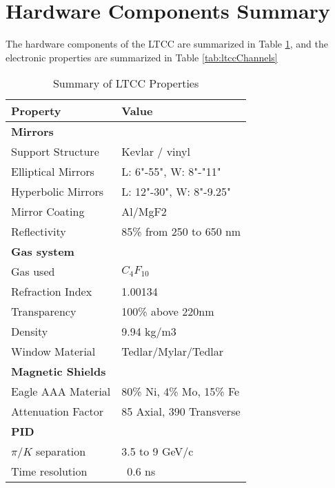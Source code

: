 \section{Hardware Components Summary}


The hardware components of the LTCC are summarized in Table \ref{tab:ltccProperties}, and the electronic properties
are summarized in Table \ref{tab:ltccChannels}

\begin{table}
	\begin{center}
		\begin{tabular}{| l | l |}
			\hline \hline
			Property                 & Value \\
			\hline
			{\bf Mirrors}            &                               \\
			Support Structure        & Kevlar / vinyl                \\
			Elliptical Mirrors       & L: 6"-55", W: 8"-"11"         \\
			Hyperbolic Mirrors       & L: 12"-30", W: 8"-9.25"       \\
			Mirror Coating           & Al/MgF2                       \\
			Reflectivity             & 85\% from 250 to 650 nm       \\
			{\bf Gas system}         &                               \\
			Gas used                 &   $C_4F_{10}$                 \\
			Refraction Index         & 1.00134                       \\
			Transparency             & 100\% above 220nm             \\
			Density                  & 9.94 kg/m3                    \\
			Window Material          & Tedlar/Mylar/Tedlar           \\
			{\bf Magnetic Shields}   &                               \\
			Eagle AAA Material       & 80\% Ni, 4\% Mo, 15\% Fe      \\
			Attenuation Factor       &  85 Axial, 390 Transverse     \\
			{\bf PID}                &                               \\
			$\pi/K$ separation       &  3.5 to 9 GeV/c               \\
			Time resolution          &  ~0.6 ns                      \\
			\hline \hline
		\end{tabular}
	\end{center}
\caption{Summary of LTCC Properties}\label{tab:ltccProperties}
\end{table}

